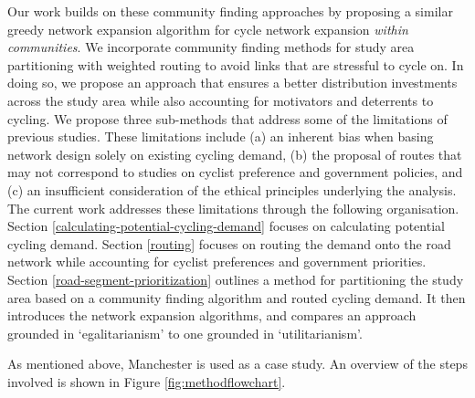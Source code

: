 \documentclass[
]{article}
\providecommand{\DIFaddbegin}{} %
\providecommand{\DIFaddend}{} %
\newcommand{\DIFaddincludegraphics}[2][]{{\color{blue}\fbox{\DIFOincludegraphics[#1]{#2}}}} %
\DeclareRobustCommand{\DIFaddbegin}{\DIFOaddbegin \let\includegraphics\DIFaddincludegraphics} %
\DeclareRobustCommand{\DIFaddend}{\DIFOaddend \let\includegraphics\DIFOincludegraphics} %
\begin{document}
Our work builds on these community finding approaches by proposing a similar greedy network expansion algorithm for cycle network expansion \emph{within communities}.
We incorporate community finding methods for study area partitioning with weighted routing to avoid links that are stressful to cycle on.
In doing so, we propose an approach that ensures a better distribution investments across the study area while also accounting for motivators and deterrents to cycling.
We propose three sub-methods that address some of the limitations of previous studies.
These limitations include (a) an inherent bias when basing network design solely on existing cycling demand, (b) the proposal of routes that may not correspond to studies on cyclist preference and government policies, and (c) an insufficient consideration of the ethical principles underlying the analysis.
The current work addresses these limitations through the following organisation.
Section \ref{calculating-potential-cycling-demand} focuses on calculating potential cycling demand.
Section \ref{routing} focuses on routing the demand onto the road network while accounting for cyclist preferences and government priorities.
Section \ref{road-segment-prioritization} outlines a method for partitioning the study area based on a community finding algorithm and routed cycling demand.
It then introduces the network expansion algorithms, and compares an approach grounded in `egalitarianism' to one grounded in `utilitarianism'.
\DIFaddbegin 

\DIFaddend As mentioned above, Manchester is used as a case study.
An overview of the steps involved is shown in Figure \ref{fig:methodflowchart}.
\end{document}
